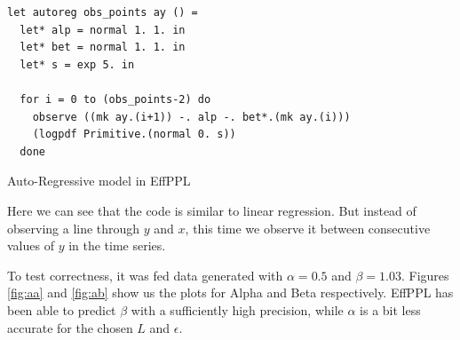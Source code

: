 \documentclass[a4paper,11pt]{article}
\theoremstyle{mytheor}
\begin{document}
\begin{listing}[H]\centering
\begin{verbatim}
let autoreg obs_points ay () =
  let* alp = normal 1. 1. in 
  let* bet = normal 1. 1. in 
  let* s = exp 5. in 
	
  for i = 0 to (obs_points-2) do 
    observe ((mk ay.(i+1)) -. alp -. bet*.(mk ay.(i))) 
    (logpdf Primitive.(normal 0. s))
  done
\end{verbatim}
\caption{Auto-Regressive model in EffPPL}
\end{listing}      

    Here we can see that the code is similar to linear regression. But instead of observing a line through $y$ and $x$, this time we observe it between consecutive values of $y$ in the time series. 

    To test correctness, it was fed data generated with $\alpha = 0.5$ and $\beta = 1.03$. Figures \ref{fig:aa} and \ref{fig:ab} show us the plots for Alpha and Beta respectively. EffPPL has been able to predict $\beta$ with a sufficiently high precision, while $\alpha$ is a bit less accurate for the chosen $L$ and $\epsilon$. 
\end{document}
